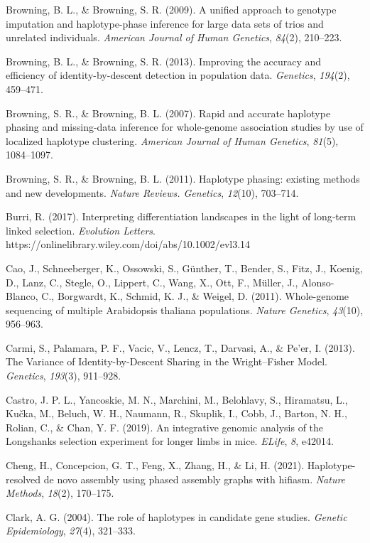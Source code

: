 \documentclass[twocolumn]{bmcart}%
\begin{document}
\begin{backmatter}
Browning, B. L., \& Browning, S. R. (2009). A unified approach to
genotype imputation and haplotype-phase inference for large data sets of
trios and unrelated individuals. \emph{American Journal of Human
Genetics}, \emph{84}(2), 210--223.

Browning, B. L., \& Browning, S. R. (2013). Improving the accuracy and
efficiency of identity-by-descent detection in population data.
\emph{Genetics}, \emph{194}(2), 459--471.

Browning, S. R., \& Browning, B. L. (2007). Rapid and accurate haplotype
phasing and missing-data inference for whole-genome association studies
by use of localized haplotype clustering. \emph{American Journal of
Human Genetics}, \emph{81}(5), 1084--1097.

Browning, S. R., \& Browning, B. L. (2011). Haplotype phasing: existing
methods and new developments. \emph{Nature Reviews. Genetics},
\emph{12}(10), 703--714.

Burri, R. (2017). Interpreting differentiation landscapes in the light
of long‐term linked selection. \emph{Evolution Letters}.
https://onlinelibrary.wiley.com/doi/abs/10.1002/evl3.14

Cao, J., Schneeberger, K., Ossowski, S., Günther, T., Bender, S., Fitz,
J., Koenig, D., Lanz, C., Stegle, O., Lippert, C., Wang, X., Ott, F.,
Müller, J., Alonso-Blanco, C., Borgwardt, K., Schmid, K. J., \& Weigel,
D. (2011). Whole-genome sequencing of multiple Arabidopsis thaliana
populations. \emph{Nature Genetics}, \emph{43}(10), 956--963.

Carmi, S., Palamara, P. F., Vacic, V., Lencz, T., Darvasi, A., \& Pe'er,
I. (2013). The Variance of Identity-by-Descent Sharing in the
Wright--Fisher Model. \emph{Genetics}, \emph{193}(3), 911--928.

Castro, J. P. L., Yancoskie, M. N., Marchini, M., Belohlavy, S.,
Hiramatsu, L., Kučka, M., Beluch, W. H., Naumann, R., Skuplik, I., Cobb,
J., Barton, N. H., Rolian, C., \& Chan, Y. F. (2019). An integrative
genomic analysis of the Longshanks selection experiment for longer limbs
in mice. \emph{ELife}, \emph{8}, e42014.

Cheng, H., Concepcion, G. T., Feng, X., Zhang, H., \& Li, H. (2021).
Haplotype-resolved de novo assembly using phased assembly graphs with
hifiasm. \emph{Nature Methods}, \emph{18}(2), 170--175.

Clark, A. G. (2004). The role of haplotypes in candidate gene studies.
\emph{Genetic Epidemiology}, \emph{27}(4), 321--333.


\end{backmatter}
\end{document}
